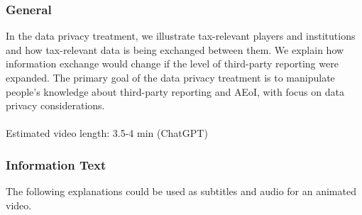 \documentclass[11pt]{article}
\begin{document}
\subsubsection*{General}
In the data privacy treatment, we illustrate tax-relevant players and institutions and how tax-relevant data is being exchanged between them. We explain how information exchange would change if the level of third-party reporting were expanded. The primary goal of the data privacy treatment is to manipulate people’s knowledge about third-party reporting and AEoI, with focus on data privacy considerations.\\ \\  
Estimated video length: 3.5-4 min (ChatGPT)
\subsubsection*{Information Text}
The following explanations could be used as subtitles and audio for an animated video.
\end{document}
